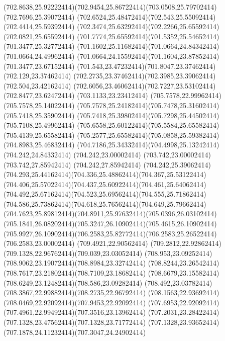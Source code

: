 {{	\curveto(702.8638,25.92222414)(702.9454,25.86722414)(703.0508,25.79702414)
	\lineto(702.7696,25.39072414)
	\curveto(702.6524,25.48472414)(702.543,25.55092414)(702.4414,25.59392414)
	\curveto(702.3474,25.63292414)(702.2266,25.65592414)(702.0821,25.65592414)
	\curveto(701.7774,25.65592414)(701.5352,25.54652414)(701.3477,25.32772414)
	\curveto(701.1602,25.11682414)(701.0664,24.84342414)(701.0664,24.49962414)
	\curveto(701.0664,24.15592414)(701.1604,23.87852414)(701.3477,23.67152414)
	\curveto(701.543,23.47232414)(701.8047,23.37462414)(702.129,23.37462414)
	\curveto(702.2735,23.37462414)(702.3985,23.39062414)(702.504,23.42162414)
	\curveto(702.6056,23.46062414)(702.7227,23.53102414)(702.8477,23.62472414)
	\lineto(703.1133,23.23412414)
	\closepath
	\moveto(705.7578,22.99962414)
	\lineto(705.7578,25.14022414)
	\curveto(705.7578,25.24182414)(705.7478,25.31602414)(705.7418,25.35902414)
	\curveto(705.7418,25.39802414)(705.7298,25.44502414)(705.7108,25.49962414)
	\curveto(705.6558,25.60122414)(705.5584,25.65582414)(705.4139,25.65582414)
	\curveto(705.2577,25.65582414)(705.0858,25.59382414)(704.8983,25.46832414)
	\curveto(704.7186,25.34332414)(704.4998,25.13242414)(704.242,24.84332414)
	\lineto(704.242,23.00002414)
	\lineto(703.742,23.00002414)
	\lineto(703.742,27.85942414)
	\lineto(704.242,27.85942414)
	\lineto(704.242,25.39062414)
	\curveto(704.293,25.44162414)(704.336,25.48862414)(704.367,25.53122414)
	\curveto(704.406,25.57022414)(704.437,25.60922414)(704.461,25.64062414)
	\curveto(704.492,25.67162414)(704.523,25.69562414)(704.555,25.71862414)
	\curveto(704.586,25.73862414)(704.618,25.76562414)(704.649,25.79662414)
	\curveto(704.7623,25.89812414)(704.8911,25.97632414)(705.0396,26.03102414)
	\curveto(705.1841,26.08202414)(705.3247,26.10902414)(705.4615,26.10902414)
	\curveto(705.9927,26.10902414)(706.2583,25.82772414)(706.2583,25.26522414)
	\lineto(706.2583,23.00002414)
	\closepath
	\moveto(709.4921,22.90562414)
	\curveto(709.2812,22.92862414)(709.1328,22.96762414)(709.039,23.03052414)
	\curveto(708.953,23.09252414)(708.9062,23.19072414)(708.8984,23.32742414)
	\curveto(708.8244,23.26542414)(708.7617,23.21802414)(708.7109,23.18682414)
	\curveto(708.6679,23.15582414)(708.6249,23.12482414)(708.586,23.09282414)
	\curveto(708.492,23.03782414)(708.3867,22.99882414)(708.2735,22.96792414)
	\curveto(708.1563,22.93692414)(708.0469,22.92092414)(707.9453,22.92092414)
	\curveto(707.6953,22.92092414)(707.4961,22.99492414)(707.3516,23.13962414)
	\curveto(707.2031,23.28422414)(707.1328,23.47562414)(707.1328,23.71772414)
	\curveto(707.1328,23.93652414)(707.1878,24.11232414)(707.3047,24.24902414)
}}
